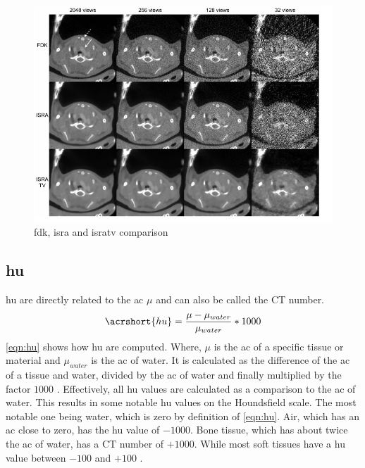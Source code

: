 \begin{figure}[h]
	\centerline{
		\includegraphics[scale=0.5]{images/alg-comp.png}}
	\caption{\gls{fdk}, \gls{isra} and \gls{isratv} comparison \cite{vandeghinsteLowDoseMicroCTImaging2013}}
	\label{fig:alg-comp}
\end{figure}

\subsection{\acrfull{hu}}
\label{s:b-hu}
\acrfull{hu} are directly related to the \acrfull{ac} $\mu$
and can also be called the CT number.
\begin{equation} \label{eqn:hu}
	\acrshort{hu} = \frac{\mu - \mu_{water}}{\mu_{water}}*1000
\end{equation}
\noindent
\cref{eqn:hu} shows how \acrshort{hu} are computed.
Where, $\mu$ is the \acrlong{ac} of a specific tissue or material and $\mu_{water}$
is the \acrlong{ac} of water.
It is calculated as the difference of the \acrlong{ac} of a tissue and water,
divided by the \acrshort{ac} of water and finally multiplied by the factor $1000$ \cite{liMicrocomputedTomographySmall2008}.
Effectively, all \acrshort{hu} values are calculated as a comparison to the \acrlong{ac} of water.
This results in some notable \acrshort{hu} values on the Houndsfield scale.
The most notable one being water, which is zero by definition of \cref{eqn:hu}.
Air, which has an \acrlong{ac} close to zero, has the \acrshort{hu} value of $-1000$.
Bone tissue, which has about twice the \acrlong{ac} of water, has a CT number of $+1000$.
While most soft tissues have a \acrshort{hu} value between $-100$ and $+100$ \cite{liMicrocomputedTomographySmall2008}.

